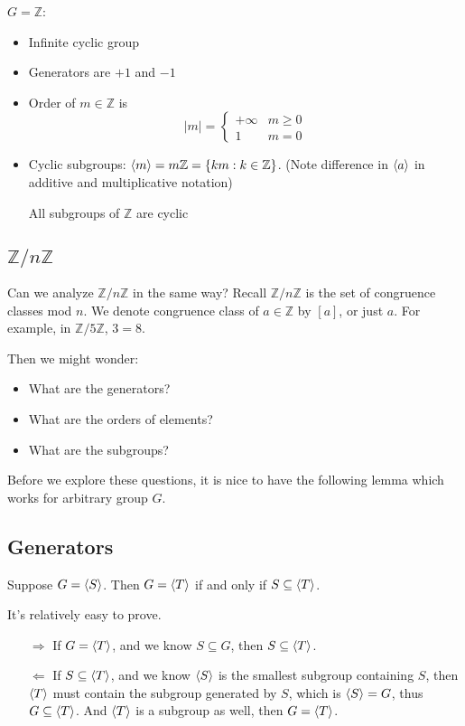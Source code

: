 \begin{ex}[$\mathbb Z$]
$G=\mathbb Z$:
\begin{itemize}
	\item Infinite cyclic group
	\item Generators are $+1$ and $-1$
	\item Order of $m\in\mathbb Z$ is 
	$$
	|m| = \begin{cases}
	+\infty & m\ge 0\\
	1 & m=0
	\end{cases}
	$$
	\item Cyclic subgroups: $\left\langle m \right\rangle = m\mathbb Z = \{km: k\in\mathbb Z\}$. (Note difference in $\left\langle a \right\rangle$ in additive and multiplicative notation)
	
	All subgroups of $\mathbb Z$ are cyclic
\end{itemize}
\end{ex}

\subsection{$\mathbb Z/n\mathbb Z$}
Can we analyze $\mathbb Z/n\mathbb Z$ in the same way? Recall $\mathbb Z/n\mathbb Z$ is the set of congruence classes mod $n$. We denote congruence class of $a\in \mathbb Z$ by $[a]$, or just $a$. For example, in $\mathbb Z/5\mathbb Z$, $3=8$.

Then we might wonder:
\begin{itemize}
	\item What are the generators?
	\item What are the orders of elements?
	\item What are the subgroups?
\end{itemize}


Before we explore these questions, it is nice to have the following lemma which works for arbitrary group $G$.

\subsection*{Generators}

\begin{lemma}
Suppose $G=\left\langle S \right\rangle$. Then $G=\left\langle T \right\rangle$ if and only if $S\subseteq \left\langle T \right\rangle$.
\end{lemma}


\begin{pf}
It's relatively easy to prove.
\begin{itemize}
	\item[$\Rightarrow$] If $G=\left\langle T \right\rangle$, and we know $S\subseteq G$, then $S\subseteq \left\langle T \right\rangle$.
	\item[$\Leftarrow$] If $S\subseteq \left\langle T \right\rangle$, and we know $\left\langle S \right\rangle$ is the smallest subgroup containing $S$, then $\left\langle T \right\rangle$ must contain the subgroup generated by $S$, which is $\left\langle S \right\rangle=G$, thus $G\subseteq \left\langle T \right\rangle$. And $\left\langle T \right\rangle$ is a subgroup as well, then $G=\left\langle T \right\rangle$.
\end{itemize}
\end{pf}

